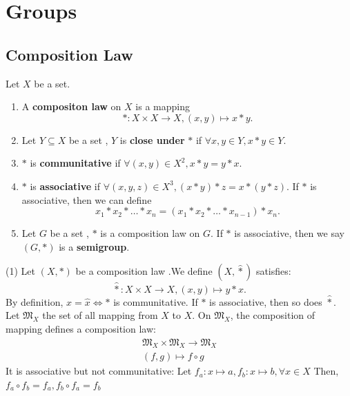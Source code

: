 \chapter{Groups}

\section{Composition Law}
\begin{definitionenv}
    Let $X$ be a set.
    \begin{enumerate}[ (i)]
        \item A \textbf{compositon law} on $X$ is a mapping
        $$*:X\times X\rightarrow X, (x, y)\mapsto x * y.$$
        \item Let $Y\subseteq X$ be a set ,  $Y$ is \textbf{close under } $*$ if $\forall x, y \in Y,  x*y\in Y$.
        \item $*$ is \textbf{communitative} if $\forall (x, y)\in X^2, x*y=y*x$.
        \item $*$ is \textbf{associative} if $\forall (x, y, z)\in X^3, (x*y)*z=x*(y*z)$.
        If $*$ is associative,  then we can define
    $$x_1*x_2*\dots *x_n=(x_1*x_2*\dots *x_{n-1})*x_n.$$
    \item Let $G$ be a set ,  $*$ is a composition law on $G$. If $*$ is associative, then we say $(G, *)$ is a \textbf{semigroup}.
    \end{enumerate}
    
    

\end{definitionenv}
\begin{exampleenv}
    \quad
    \newline
    (1) Let $(X, *)$ be a composition law .We define $(X, \hat{*})$ satisfies:
    $$\hat{*}:X\times X\rightarrow X,  (x, y)\mapsto y*x.$$
    By definition, $x=\hat{x}\Leftrightarrow *$ is communitative. If $*$ is associative,  then so does $\hat{*}$.
    Let $\mathfrak{M} _X$ the set of all mapping from $X$ to $X$. On $\mathfrak{M} _X$, the composition of mapping defines a composition law:
    $$\begin{matrix}
\mathfrak{M} _X\times \mathfrak{M} _X\rightarrow\mathfrak{M} _X \\
(f, g)\mapsto f\circ g
\end{matrix}$$
It is associative but not communitative:
\newline
Let $f_a:x\mapsto a , f_b:x\mapsto b , \forall x\in X$ Then,  $f_a\circ f_b=f_a, f_b\circ f_a=f_b$
\end{exampleenv}
